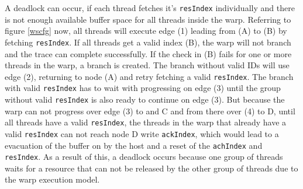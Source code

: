 	A deadlock can occur, if each thread fetches it's \verb|resIndex| individually and there is not enough available buffer space for all threads inside the warp. Referring to figure \ref{wscfg} now, all threads will execute edge (1) leading from (A) to (B) by fetching \verb|resIndex|. If all threads get a valid index (B), the warp will not branch and the trace can complete successfully.
	If the check in (B) fails for one or more threads in the warp, a branch is created. The branch without valid IDs will 
	use edge (2), returning to node (A) and retry fetching a valid \verb|resIndex|. The branch with valid \verb|resIndex|
	has to wait with progressing on edge (3) until the group without valid \verb|resIndex| is also ready to continue on edge (3).
	But because the warp can not progress over edge (3) to and C and from there over (4) to D, until all threads have a valid \verb|resIndex|, the threads in the warp that already have a valid \verb|resIndex| can not reach node D write \verb|ackIndex|, which would lead to a evacuation of the buffer on by the host and a reset of the \verb|achIndex| and \verb|resIndex|. As a result of this, a deadlock occurs because one group of threads waits for a resource that can not be released by the other group
	of threads due to the warp execution model.
	

